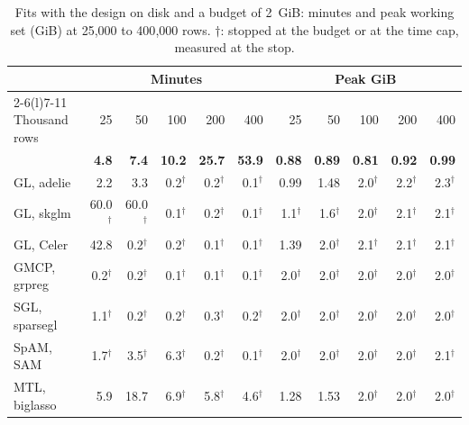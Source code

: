 \begin{table}[t]
\caption{Fits with the design on disk and a budget of 2~GiB: minutes and peak working set (GiB) at 25{,}000 to 400{,}000 rows. $\dagger$: stopped at the budget or at the time cap, measured at the stop.}
\label{tab:ooc}
\centering
\scriptsize
\setlength{\tabcolsep}{1.2pt}
\begin{tabular*}{\columnwidth}{@{\extracolsep{\fill}}lrrrrrrrrrr@{}}
\toprule
& \multicolumn{5}{c}{Minutes} & \multicolumn{5}{c}{Peak GiB}\\
\cmidrule(lr){2-6}\cmidrule(l){7-11}
Thousand rows & 25 & 50 & 100 & 200 & 400 & 25 & 50 & 100 & 200 & 400\\
\midrule
\textbf{\sys{}} & \cellcolor{best}\textbf{4.8} & \cellcolor{best}\textbf{7.4} & \cellcolor{best}\textbf{10.2} & \cellcolor{best}\textbf{25.7} & \cellcolor{best}\textbf{53.9} & \textbf{0.88} & \textbf{0.89} & \textbf{0.81} & \textbf{0.92} & \textbf{0.99}\\
GL, adelie & 2.2 & 3.3 & 0.2$^\dagger$ & 0.2$^\dagger$ & 0.1$^\dagger$ & 0.99 & 1.48 & 2.0$^\dagger$ & 2.2$^\dagger$ & 2.3$^\dagger$\\
GL, skglm & 60.0$^\dagger$ & 60.0$^\dagger$ & 0.1$^\dagger$ & 0.2$^\dagger$ & 0.1$^\dagger$ & 1.1$^\dagger$ & 1.6$^\dagger$ & 2.0$^\dagger$ & 2.1$^\dagger$ & 2.1$^\dagger$\\
GL, Celer & 42.8 & 0.2$^\dagger$ & 0.2$^\dagger$ & 0.1$^\dagger$ & 0.1$^\dagger$ & 1.39 & 2.0$^\dagger$ & 2.1$^\dagger$ & 2.1$^\dagger$ & 2.1$^\dagger$\\
GMCP, grpreg & 0.2$^\dagger$ & 0.2$^\dagger$ & 0.1$^\dagger$ & 0.1$^\dagger$ & 0.1$^\dagger$ & 2.0$^\dagger$ & 2.0$^\dagger$ & 2.0$^\dagger$ & 2.0$^\dagger$ & 2.0$^\dagger$\\
SGL, sparsegl & 1.1$^\dagger$ & 0.2$^\dagger$ & 0.2$^\dagger$ & 0.3$^\dagger$ & 0.2$^\dagger$ & 2.0$^\dagger$ & 2.0$^\dagger$ & 2.0$^\dagger$ & 2.0$^\dagger$ & 2.0$^\dagger$\\
SpAM, SAM & 1.7$^\dagger$ & 3.5$^\dagger$ & 6.3$^\dagger$ & 0.2$^\dagger$ & 0.1$^\dagger$ & 2.0$^\dagger$ & 2.0$^\dagger$ & 2.0$^\dagger$ & 2.0$^\dagger$ & 2.1$^\dagger$\\
MTL, biglasso & 5.9 & 18.7 & 6.9$^\dagger$ & 5.8$^\dagger$ & 4.6$^\dagger$ & 1.28 & 1.53 & 2.0$^\dagger$ & 2.0$^\dagger$ & 2.0$^\dagger$\\
\bottomrule
\end{tabular*}
\end{table}
